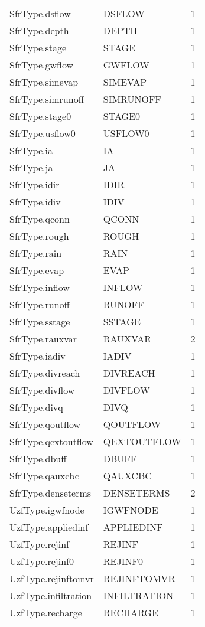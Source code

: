 \begin{longtable}{p{6cm} p{4cm} p{2cm} }
SfrType.dsflow &  DSFLOW & 1 \\ 
SfrType.depth &  DEPTH & 1 \\ 
SfrType.stage &  STAGE & 1 \\ 
SfrType.gwflow &  GWFLOW & 1 \\ 
SfrType.simevap &  SIMEVAP & 1 \\ 
SfrType.simrunoff &  SIMRUNOFF & 1 \\ 
SfrType.stage0 &  STAGE0 & 1 \\ 
SfrType.usflow0 &  USFLOW0 & 1 \\ 
SfrType.ia &  IA & 1 \\ 
SfrType.ja &  JA & 1 \\ 
SfrType.idir &  IDIR & 1 \\ 
SfrType.idiv &  IDIV & 1 \\ 
SfrType.qconn &  QCONN & 1 \\ 
SfrType.rough &  ROUGH & 1 \\ 
SfrType.rain &  RAIN & 1 \\ 
SfrType.evap &  EVAP & 1 \\ 
SfrType.inflow &  INFLOW & 1 \\ 
SfrType.runoff &  RUNOFF & 1 \\ 
SfrType.sstage &  SSTAGE & 1 \\ 
SfrType.rauxvar & RAUXVAR & 2 \\ 
SfrType.iadiv &  IADIV & 1 \\ 
SfrType.divreach &  DIVREACH & 1 \\ 
SfrType.divflow &  DIVFLOW & 1 \\ 
SfrType.divq &  DIVQ & 1 \\ 
SfrType.qoutflow &  QOUTFLOW & 1 \\ 
SfrType.qextoutflow &  QEXTOUTFLOW & 1 \\ 
SfrType.dbuff &  DBUFF & 1 \\ 
SfrType.qauxcbc &  QAUXCBC & 1 \\ 
SfrType.denseterms &  DENSETERMS & 2 \\ 
UzfType.igwfnode &  IGWFNODE & 1 \\ 
UzfType.appliedinf &  APPLIEDINF & 1 \\ 
UzfType.rejinf &  REJINF & 1 \\ 
UzfType.rejinf0 &  REJINF0 & 1 \\ 
UzfType.rejinftomvr &  REJINFTOMVR & 1 \\ 
UzfType.infiltration &  INFILTRATION & 1 \\ 
UzfType.recharge &  RECHARGE & 1 \\ 

\end{longtable}
